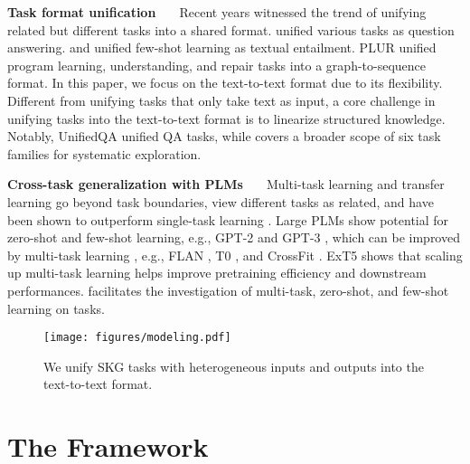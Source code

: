 \noindent\textbf{Task format unification \ \ }
Recent years witnessed the trend of unifying related but different tasks into a shared format.
\citet{abs-1806-08730} unified various tasks as question answering. \citet{YinRRSX20} and \citet{abs-2104-14690} unified few-shot learning as textual entailment. PLUR \cite{chen2021plur} unified program learning, understanding, and repair tasks into a graph-to-sequence format. In this paper, we focus on the text-to-text format \cite{2020t5} due to its flexibility. 
Different from unifying tasks that only take text as input, a core challenge in unifying \skg tasks into the text-to-text format is to linearize structured knowledge.
Notably, UnifiedQA \cite{2020unifiedqa} unified QA tasks, while \uskg covers a broader scope of six task families for systematic exploration. 

\noindent\textbf{Cross-task generalization with PLMs \ \ } 
Multi-task learning and transfer learning go beyond task boundaries, view different tasks as related, and have been shown to outperform single-task learning \cite{muppet,vu2021spot}.
Large PLMs show potential for zero-shot and few-shot learning, e.g., GPT-2 \cite{radford2019language} and GPT-3 \cite{brown2020language}, which can be improved by multi-task learning \cite{Zhong2021AdaptingLM}, e.g., FLAN \cite{Jason2021}, T0 \cite{sanh2021multitask}, and CrossFit \cite{Ye2021CrossFitAF}. ExT5 \cite{aribandi2021ext5} shows that scaling up multi-task learning helps improve pretraining efficiency and downstream performances.
\uskg facilitates the investigation of multi-task, zero-shot, and few-shot learning on \skg tasks. 

\begin{figure*}[t]
    \centering
    \texttt{[image: figures/modeling.pdf]}
    \caption{We unify SKG tasks with heterogeneous inputs and outputs into the text-to-text format. }
\label{fig:input-output-format}
\end{figure*}

\section{The \uskg Framework}
\label{sec:method}

